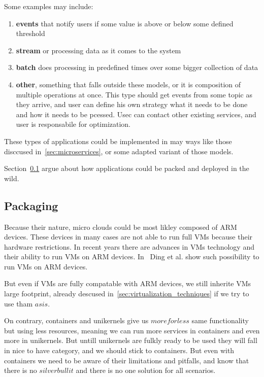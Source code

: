 Some examples may include:

\begin{enumerate}[start=1,label={(\bfseries \arabic*)}]
	\item \textbf{events} that notify users if some value is above or below some defined threshold 
	\item \textbf{stream} or processing data as it comes to the system 
	\item \textbf{batch} does processing in predefined times over some bigger collection of data 
	\item \textbf{other}, something that falls outside these models, or it is composition of multiple operations at once. This type should get events from some topic as they arrive, and user can define his own strategy what it needs to be done and how it needs to be pcessed. Usec can contact other existing services, and user is responsabile for optimization.
\end{enumerate}

These types of applications could be implemented in may ways like those disccused in~\ref{sec:microservices}, or some adapted variant of those models.

Section~\ref{sec:packaging} argue about how applications could be packed and deployed in the wild.
%
\subsection{Packaging}\label{sec:packaging}
%
Because their nature, micro clouds could be most likley composed of ARM devices. These devices in many cases are not able to run full VMs because their hardware restrictions. In recent years there are advances in VMs technology and their ability to run VMs on ARM devices. In~\cite{Ding12armvisor} Ding et al. show such possibility to run VMs on ARM devices.

But even if VMs are fully compatable with ARM devices, we still inherite VMs large footprint, already descused in~\ref{sec:virtualization_techniques} if we try to use tham $as is$.

On contrary, containers and unikernels give us $more for less$ same functionality but using less resources, meaning we can run more services in containers and even more in unikernels. But untill unikernels are fulkly ready to be used they will fall in nice to have category, and we should stick to containers. But even with containers we need to be aware of their limitations and pitfalls, and know that there is no $silver bullit$ and there is no one solution for all scenarios.

